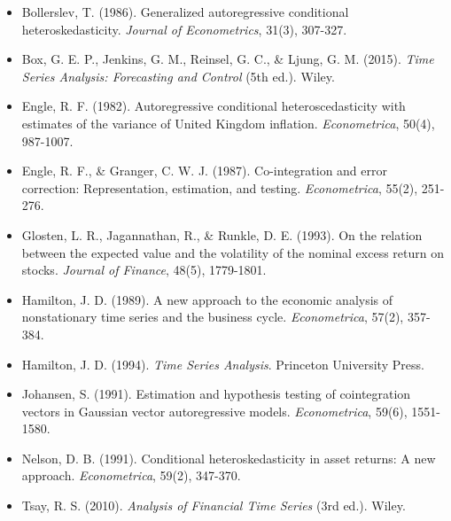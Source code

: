 \documentclass[a4paper, 11pt]{article}
\begin{document}
\begin{itemize}
\item Bollerslev, T. (1986). Generalized autoregressive conditional heteroskedasticity.
      \textit{Journal of Econometrics}, 31(3), 307-327.
\item Box, G. E. P., Jenkins, G. M., Reinsel, G. C., \& Ljung, G. M. (2015).
      \textit{Time Series Analysis: Forecasting and Control} (5th ed.). Wiley.
\item Engle, R. F. (1982). Autoregressive conditional heteroscedasticity with estimates
      of the variance of United Kingdom inflation. \textit{Econometrica}, 50(4), 987-1007.
\item Engle, R. F., \& Granger, C. W. J. (1987). Co-integration and error correction:
      Representation, estimation, and testing. \textit{Econometrica}, 55(2), 251-276.
\item Glosten, L. R., Jagannathan, R., \& Runkle, D. E. (1993). On the relation between
      the expected value and the volatility of the nominal excess return on stocks.
      \textit{Journal of Finance}, 48(5), 1779-1801.
\item Hamilton, J. D. (1989). A new approach to the economic analysis of nonstationary
      time series and the business cycle. \textit{Econometrica}, 57(2), 357-384.
\item Hamilton, J. D. (1994). \textit{Time Series Analysis}. Princeton University Press.
\item Johansen, S. (1991). Estimation and hypothesis testing of cointegration vectors in
      Gaussian vector autoregressive models. \textit{Econometrica}, 59(6), 1551-1580.
\item Nelson, D. B. (1991). Conditional heteroskedasticity in asset returns: A new approach.
      \textit{Econometrica}, 59(2), 347-370.
\item Tsay, R. S. (2010). \textit{Analysis of Financial Time Series} (3rd ed.). Wiley.
\end{itemize}
\end{document}
